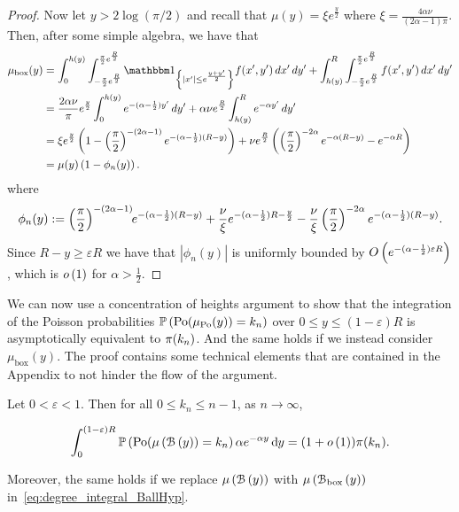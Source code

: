 \begin{proof}
Now let $y > 2 \log(\pi/2)$ and recall that $\mu(y) = \xi e^{\frac{y}{2}}$ where $\xi = \frac{4\alpha \nu}{(2\alpha - 1)\pi}$. Then, after some simple algebra, we have that
\begin{align*}
	\mu_{\mathrm{box}}(y)
	&= \int_0^{h(y)} \int_{-\frac{\pi}{2}e^{\frac{R}{2}}}^{\frac{\pi}{2}e^{\frac{R}{2}}} 
		\ind{|x^\prime| \le e^{\frac{y+y^\prime}{2}}} f(x^\prime,y^\prime) \, dx^\prime \, dy^\prime
		+ \int_{h(y)}^{R} \int_{-\frac{\pi}{2}e^{\frac{R}{2}}}^{\frac{\pi}{2}e^{\frac{R}{2}}} 
		f(x^\prime,y^\prime) \, dx^\prime \, dy^\prime\\
	&= \frac{2 \alpha \nu}{\pi} e^{\frac{y}{2}} \int_0^{h(y)} e^{-(\alpha - \frac{1}{2})y^\prime} \, dy^\prime
		+ \alpha \nu e^{\frac{R}{2}} \int_{h(y)}^{R} e^{-\alpha y^\prime} \, dy^\prime \\
	&= \xi e^{\frac{y}{2}}\left(1 - \left(\frac{\pi}{2}\right)^{-(2\alpha - 1)} 
		e^{-(\alpha - \frac{1}{2})(R - y)}\right)
	+ \nu e^{\frac{R}{2}}\left(\left(\frac{\pi}{2}\right)^{-2\alpha} e^{-\alpha(R - y)} 
		- e^{-\alpha R}\right)\\
	&= \mu(y)\left(1 - \phi_n(y) \right).
\end{align*}
where 
\begin{equation}\label{eq:def_average_degree_Gbox_phi}
	\phi_n(y) :=  \left(\frac{\pi}{2}\right)^{-(2\alpha - 1)} \hspace{-3pt} e^{-(\alpha - \frac{1}{2})(R - y)}
				+ \frac{\nu}{\xi}e^{-(\alpha - \frac{1}{2})R - \frac{y}{2}} - \frac{\nu}{\xi}\left(\frac{\pi}{2}\right)^{-2\alpha} e^{-(\alpha-\frac{1}{2})(R - y)}.
\end{equation}
Since $R - y \ge \varepsilon R$ we have that $|\phi_n(y)|$ is uniformly bounded by
$O\left(e^{-(\alpha - \frac{1}{2})\varepsilon R}\right)$, which is $o\left(1\right)$ for $\alpha > \frac{1}{2}$. 
\end{proof}

We can now use a concentration of heights argument to show that the integration of the Poisson probabilities $\mathbb{P}\left({\mathrm{Po}}(\mu_{{\mathrm{Po}}}(y)) = k_n\right)$ over $0 \le y \le (1-\varepsilon) R$ is asymptotically equivalent to ${\pi}(k_n)$. And the same holds if we instead consider $\mu_{\mathrm{box}}(y)$. The proof contains some technical elements that are contained in the Appendix to not hinder the flow of the argument. 

\begin{lemma}\label{lem:degree_integral}
Let $0 < \varepsilon < 1$. Then for all $0 \le k_n \le n - 1$, as $n \to \infty$,

\begin{equation}\label{eq:degree_integral_BallHyp}
	\int_0^{(1-\varepsilon)R} \mathbb{P}\left({\mathrm{Po}}(\mu\left({\mathcal B}\left(y\right)\right) = k_n\right) \alpha e^{-\alpha y} \operatorname{\mathrm{d}\hspace{-2pt}} y
	= (1+o\left(1\right)) {\pi}(k_n).
\end{equation}

Moreover, the same holds if we replace $\mu\left({\mathcal B}\left(y\right)\right)$ with $\mu\left({\mathcal B}_{\text{box}}\left(y\right)\right)$ in~\eqref{eq:degree_integral_BallHyp}.
\end{lemma}

